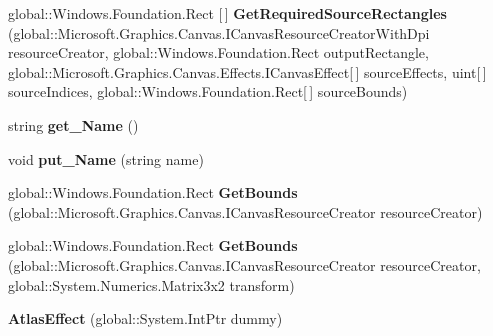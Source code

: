 \begin{DoxyCompactItemize}
global\+::\+Windows.\+Foundation.\+Rect \mbox{[}$\,$\mbox{]} {\bfseries Get\+Required\+Source\+Rectangles} (global\+::\+Microsoft.\+Graphics.\+Canvas.\+I\+Canvas\+Resource\+Creator\+With\+Dpi resource\+Creator, global\+::\+Windows.\+Foundation.\+Rect output\+Rectangle, global\+::\+Microsoft.\+Graphics.\+Canvas.\+Effects.\+I\+Canvas\+Effect\mbox{[}$\,$\mbox{]} source\+Effects, uint\mbox{[}$\,$\mbox{]} source\+Indices, global\+::\+Windows.\+Foundation.\+Rect\mbox{[}$\,$\mbox{]} source\+Bounds)
\item 
\mbox{\label{class_microsoft_1_1_graphics_1_1_canvas_1_1_effects_1_1_atlas_effect_a902afae189388ba6ee558b945f702ce9}} 
string {\bfseries get\+\_\+\+Name} ()
\item 
\mbox{\label{class_microsoft_1_1_graphics_1_1_canvas_1_1_effects_1_1_atlas_effect_ac8e055fa19cdf099c03e817518eb3a22}} 
void {\bfseries put\+\_\+\+Name} (string name)
\item 
\mbox{\label{class_microsoft_1_1_graphics_1_1_canvas_1_1_effects_1_1_atlas_effect_aa4b944d340dc47c1e8de93692bf057fb}} 
global\+::\+Windows.\+Foundation.\+Rect {\bfseries Get\+Bounds} (global\+::\+Microsoft.\+Graphics.\+Canvas.\+I\+Canvas\+Resource\+Creator resource\+Creator)
\item 
\mbox{\label{class_microsoft_1_1_graphics_1_1_canvas_1_1_effects_1_1_atlas_effect_af407ba20dad039a6d8dbb231b3b3718d}} 
global\+::\+Windows.\+Foundation.\+Rect {\bfseries Get\+Bounds} (global\+::\+Microsoft.\+Graphics.\+Canvas.\+I\+Canvas\+Resource\+Creator resource\+Creator, global\+::\+System.\+Numerics.\+Matrix3x2 transform)
\item 
\mbox{\label{class_microsoft_1_1_graphics_1_1_canvas_1_1_effects_1_1_atlas_effect_a9224bd02ca7d3b31765c8f85e77066bd}} 
{\bfseries Atlas\+Effect} (global\+::\+System.\+Int\+Ptr dummy)
\item 
\mbox{\label{class_microsoft_1_1_graphics_1_1_canvas_1_1_effects_1_1_atlas_effect_a565fbf00024f2bc49eda0142d8328107}} 

\end{DoxyCompactItemize}
